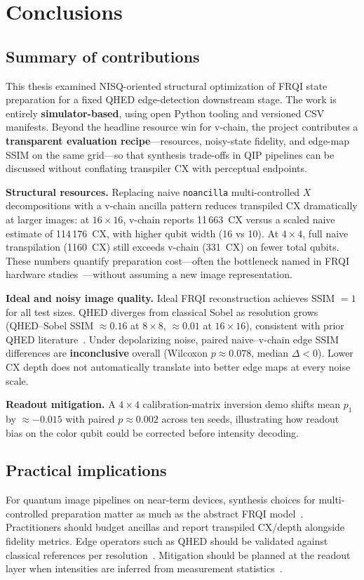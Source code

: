 \chapter{Conclusions}\label{ch:conclusions}
\thispagestyle{pagestyle}

\section{Summary of contributions}
This thesis examined NISQ-oriented structural optimization of FRQI state preparation for a fixed QHED edge-detection downstream stage. The work is entirely \textbf{simulator-based}, using open Python tooling and versioned CSV manifests. Beyond the headline resource win for v-chain, the project contributes a \textbf{transparent evaluation recipe}---resources, noisy-state fidelity, and edge-map SSIM on the same grid---so that synthesis trade-offs in QIP pipelines can be discussed without conflating transpiler CX with perceptual endpoints.

\textbf{Structural resources.} Replacing naive \texttt{noancilla} multi-controlled $X$ decompositions with a v-chain ancilla pattern reduces transpiled CX dramatically at larger images: at $16\times 16$, v-chain reports 11\,663~CX versus a scaled naive estimate of 114\,176~CX, with higher qubit width (16 vs 10). At $4\times 4$, full naive transpilation (1160~CX) still exceeds v-chain (331~CX) on fewer total qubits. These numbers quantify preparation cost---often the bottleneck named in FRQI hardware studies~\cite{Geng2023ImprovedFRQI}---without assuming a new image representation.

\textbf{Ideal and noisy image quality.} Ideal FRQI reconstruction achieves SSIM $=1$ for all test sizes. QHED diverges from classical Sobel as resolution grows (QHED--Sobel SSIM $\approx 0.16$ at $8\times 8$, $\approx 0.01$ at $16\times 16$), consistent with prior QHED literature~\cite{Yao2017QHED}. Under depolarizing noise, paired naive--v-chain edge SSIM differences are \textbf{inconclusive} overall (Wilcoxon $p \approx 0.078$, median $\Delta < 0$). Lower CX depth does not automatically translate into better edge maps at every noise scale.

\textbf{Readout mitigation.} A $4\times 4$ calibration-matrix inversion demo shifts mean $p_1$ by $\approx -0.015$ with paired $p \approx 0.002$ across ten seeds, illustrating how readout bias on the color qubit could be corrected before intensity decoding.

\section{Practical implications}
For quantum image pipelines on near-term devices, synthesis choices for multi-controlled preparation matter as much as the abstract FRQI model~\cite{Le2011FRQI,Vale2023MCSU2,Azevedo2024LowDepthMCG}. Practitioners should budget ancillas and report transpiled CX/depth alongside fidelity metrics. Edge operators such as QHED should be validated against classical references per resolution~\cite{QiskitTextbookQuantumEdgeDetection}. Mitigation should be planned at the readout layer when intensities are inferred from measurement statistics~\cite{Mu2025GuidedImageFiltering}.

